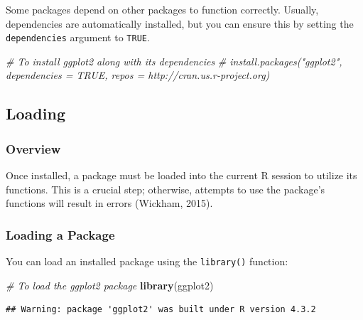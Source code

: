 \documentclass[
  b5paper]{book}
\newenvironment{Shaded}{\begin{snugshade}}{\end{snugshade}}
\newcommand{\CommentTok}[1]{\textcolor[rgb]{0.56,0.35,0.01}{\textit{#1}}}
\newcommand{\FunctionTok}[1]{\textcolor[rgb]{0.13,0.29,0.53}{\textbf{#1}}}
\newcommand{\NormalTok}[1]{#1}
\begin{document}
Some packages depend on other packages to function correctly. Usually, dependencies are automatically installed, but you can ensure this by setting the \texttt{dependencies} argument to \texttt{TRUE}.

\begin{Shaded}
\begin{Highlighting}[]
\CommentTok{\# To install ggplot2 along with its dependencies}
\CommentTok{\# install.packages("ggplot2", dependencies = TRUE, repos = \textquotesingle{}http://cran.us.r{-}project.org\textquotesingle{})}
\end{Highlighting}
\end{Shaded}

\hypertarget{loading}{%
\subsection*{Loading}\label{loading}}

\hypertarget{overview-7}{%
\subsubsection*{Overview}\label{overview-7}}

Once installed, a package must be loaded into the current R session to utilize its functions. This is a crucial step; otherwise, attempts to use the package's functions will result in errors (Wickham, 2015).

\hypertarget{loading-a-package}{%
\subsubsection*{Loading a Package}\label{loading-a-package}}

You can load an installed package using the \texttt{library()} function:

\begin{Shaded}
\begin{Highlighting}[]
\CommentTok{\# To load the ggplot2 package}
\FunctionTok{library}\NormalTok{(ggplot2)}
\end{Highlighting}
\end{Shaded}

\begin{verbatim}
## Warning: package 'ggplot2' was built under R version 4.3.2
\end{verbatim}
\end{document}
